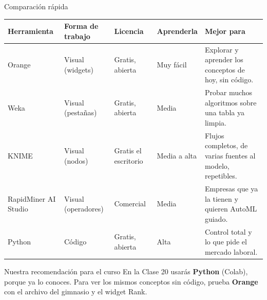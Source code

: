 \documentclass[aspectratio=169,11pt]{beamer}
\begin{document}
\begin{frame}[t]{Comparación rápida}
  \footnotesize
  \renewcommand{\arraystretch}{1.05}
  \begin{tabular}{@{}L{2.0cm}L{2.0cm}L{1.9cm}L{1.7cm}L{4.7cm}@{}}
    \toprule
    \textbf{Herramienta} & \textbf{Forma de trabajo} & \textbf{Licencia} & \textbf{Aprenderla} & \textbf{Mejor para} \\
    \midrule
    Orange & Visual (widgets) & Gratis, abierta & Muy fácil & Explorar y aprender los conceptos de hoy, sin código. \\
    Weka & Visual (pestañas) & Gratis, abierta & Media & Probar muchos algoritmos sobre una tabla ya limpia. \\
    KNIME & Visual (nodos) & Gratis el escritorio & Media a alta & Flujos completos, de varias fuentes al modelo, repetibles. \\
    RapidMiner AI Studio & Visual (operadores) & Comercial & Media & Empresas que ya la tienen y quieren AutoML guiado. \\
    Python & Código & Gratis, abierta & Alta & Control total y lo que pide el mercado laboral. \\
    \bottomrule
  \end{tabular}
  \vspace{0.05cm}
  \begin{exampleblock}{Nuestra recomendación para el curso}
    \footnotesize En la Clase 20 usarás \textbf{Python} (Colab), porque ya
    lo conoces. Para ver los mismos conceptos sin código, prueba
    \textbf{Orange} con el archivo del gimnasio y el widget Rank.
  \end{exampleblock}
\end{frame}

\end{document}
